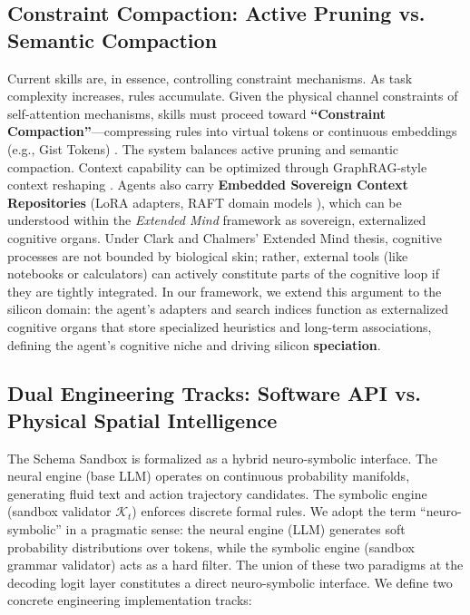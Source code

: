 \documentclass[10pt,journal,compsoc]{IEEEtran}
\begin{document}
\subsection{Constraint Compaction: Active Pruning vs. Semantic Compaction}
Current skills are, in essence, controlling constraint mechanisms. As task complexity increases, rules accumulate. Given the physical channel constraints of self-attention mechanisms, skills must proceed toward \textbf{``Constraint Compaction''}---compressing rules into virtual tokens or continuous embeddings (e.g., Gist Tokens) \cite{mu2023}. The system balances active pruning and semantic compaction. Context capability can be optimized through GraphRAG-style context reshaping \cite{edge2024}. Agents also carry \textbf{Embedded Sovereign Context Repositories} (LoRA adapters, RAFT domain models \cite{zhang2024}), which can be understood within the \textit{Extended Mind} framework \cite{clark1998} as sovereign, externalized cognitive organs. Under Clark and Chalmers' Extended Mind thesis, cognitive processes are not bounded by biological skin; rather, external tools (like notebooks or calculators) can actively constitute parts of the cognitive loop if they are tightly integrated. In our framework, we extend this argument to the silicon domain: the agent's adapters and search indices function as externalized cognitive organs that store specialized heuristics and long-term associations, defining the agent's cognitive niche and driving silicon \textbf{speciation}.

\subsection{Dual Engineering Tracks: Software API vs. Physical Spatial Intelligence}
The Schema Sandbox is formalized as a hybrid neuro-symbolic interface. The neural engine (base LLM) operates on continuous probability manifolds, generating fluid text and action trajectory candidates. The symbolic engine (sandbox validator $\mathcal{K}_t$) enforces discrete formal rules. We adopt the term ``neuro-symbolic'' in a pragmatic sense: the neural engine (LLM) generates soft probability distributions over tokens, while the symbolic engine (sandbox grammar validator) acts as a hard filter. The union of these two paradigms at the decoding logit layer constitutes a direct neuro-symbolic interface. We define two concrete engineering implementation tracks:
\end{document}
